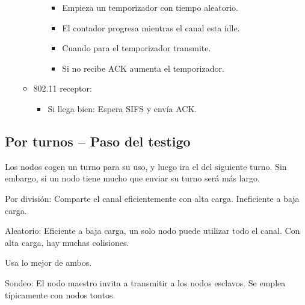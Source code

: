 \documentclass[12pt, twoside, openright]{report} %
\begin{document}
\begin{itemize}
\begin{itemize}
\begin{itemize}
                \begin{itemize}
                      \item
                  Empieza un temporizador con tiempo aleatorio.
                \item
                  El contador progresa mientras el canal esta idle.
                \item
                  Cuando para el temporizador transmite.
                \item
                  Si no recibe ACK aumenta el temporizador.
                \end{itemize}
              \end{itemize}
            \item
              802.11 receptor:

              \begin{itemize}
                  \item
                Si llega bien: Espera SIFS y envía ACK.
              \end{itemize}
            \end{itemize}
          \end{itemize}
     

\subsection{Por turnos -- Paso del testigo} Los nodos cogen un turno para su
      uso, y luego ira el del siguiente turno. Sin embargo, si un nodo
      tiene mucho que enviar su turno será más largo.

    
      
        Por división: Comparte el canal eficientemente con alta carga.
        Ineficiente a baja carga.

        Aleatorio: Eficiente a baja carga, un solo nodo puede utilizar
        todo el canal. Con alta carga, hay muchas colisiones.

        Usa lo mejor de ambos.

        Sondeo: El nodo maestro invita a transmitir a los nodos
        esclavos. Se emplea típicamente con nodos tontos.
\end{document}
